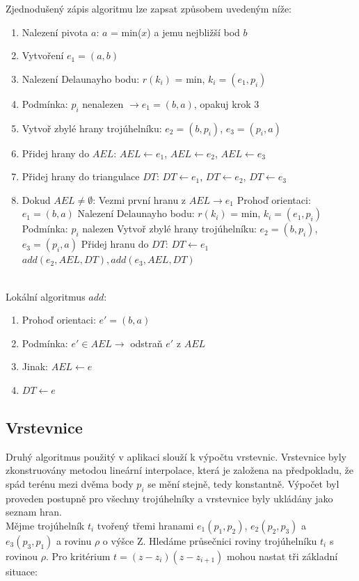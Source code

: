 \documentclass[a4paper, 12pt]{article}
\begin{document}
Zjednodušený zápis algoritmu lze zapsat způsobem uvedeným níže:

\begin{enumerate}
\item Nalezení pivota $a$: $a$ = min($x$) a jemu nejbližší bod $b$
\item Vytvoření $e_1 = (a,b)$
\item Nalezení Delaunayho bodu: $r(k_i)$ = min, $k_i = (e_1,p_i)$
\item Podmínka: $p_i$ nenalezen $\rightarrow e_1 = (b,a)$, opakuj krok 3
\item Vytvoř zbylé hrany trojúhelníku: $e_2 = (b,p_i)$, $e_3 = (p_i,a)$
\item Přidej hrany do $AEL$: $AEL \leftarrow e_1$, $AEL \leftarrow e_2$, $AEL \leftarrow e_3$
\item Přidej hrany do triangulace $DT$: $DT \leftarrow e_1$, $DT \leftarrow e_2$, $DT \leftarrow e_3$
\item Dokud $AEL \neq \emptyset$:
\subitem Vezmi první hranu z $AEL \rightarrow e_1$
\subitem Prohoď orientaci: $e_1 = (b,a)$
\subitem Nalezení Delaunayho bodu: $r(k_i)$ = min, $k_i = (e_1,p_i)$
\subitem Podmínka: $p_i$ nalezen 
\subsubitem Vytvoř zbylé hrany trojúhelníku: $e_2 = (b,p_i)$, $e_3 = (p_i,a)$
\subsubitem Přidej hranu do $DT$: $DT \leftarrow e_1$
\subsubitem $add(e_2,AEL,DT), add(e_3,AEL,DT)$
\end{enumerate}
~\\
Lokální algoritmus $add$:
\begin{enumerate}
\item Prohoď orientaci: $e' = (b,a)$
\item Podmínka: $e' \in AEL \rightarrow$ odstraň $e'$ z $AEL$
\item Jinak: $AEL \leftarrow e$  
\item $DT \leftarrow e$
\end{enumerate}

\subsection{Vrstevnice}
Druhý algoritmus použitý v aplikaci slouží k výpočtu vrstevnic. Vrstevnice byly zkonstruovány metodou lineární interpolace, která je založena na předpokladu, že spád terénu mezi dvěma body $p_i$ se mění stejně, tedy konstantně. Výpočet byl proveden postupně pro všechny trojúhelníky a vrstevnice byly ukládány jako seznam hran.\\

Mějme trojúhelník $t_i$ tvořený třemi hranami $e_{1}(p_{1},p_{2})$, $e_{2}(p_{2},p_{3})$ a $e_{3}(p_{3},p_{1})$ a rovinu $\rho$ o výšce Z. Hledáme průsečnici roviny trojúhelníku $t_i$ s rovinou $\rho$. Pro kritérium $t = (z-z_i)(z-z_{i+1})$ mohou nastat tři základní situace:
\end{document}
